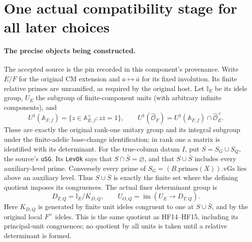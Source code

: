 \section{One actual compatibility stage for all later choices}
\label{sec:common-compatibility-v48}


\paragraph{The precise objects being constructed.}
The accepted source is the pin recorded in this component's provenance.
Write \(E/F\) for the original CM extension and \(a\mapsto\bar a\)
for its fixed involution.  Its finite relative primes are unramified,
as required by the original host.  Let \(\mathbb I_E\) be its idele
group, \(U_E\) the subgroup of finite-component units (with arbitrary
infinite components), and
\[
 U^1(\mathbb A_{F,f})=
 \{z\in\mathbb A_{E,f}^{\times}:z\bar z=1\},\qquad
 U^1(\widehat{\mathcal O}_F)=U^1(\mathbb A_{F,f})
                                  \cap\widehat{\mathcal O}_E^{\times}.
 \tag{GCF.1}
\]
These are exactly the original rank-one unitary group and its integral
subgroup under the finite-adelic base-change identification; in rank
one a matrix is identified with its determinant.  For the true-column
datum \(I\), put \(S=S_G\cup S_Q\), the source's \texttt{uSG}.
Its \texttt{LevOk} says that \(S\cap\bar S=\varnothing\), and that
\(S\cup\bar S\) includes every auxiliary-level prime.  Conversely every prime of
\(S_G=(B.\mathrm{primes}(X)).\mathrm{vGs}\) lies above an
auxiliary level.  Thus \(S\cup\bar S\) is exactly the finite
set where the defining quotient imposes its congruences.
The actual finer determinant group is
\[
 D_{T,Q}=\mathbb I_E/K_{D,Q},\qquad
 U_{O,Q}=\operatorname{im}(U_E\longrightarrow D_{T,Q}).
 \tag{GCF.2}
\]
Here \(K_{D,Q}\) is generated by finite unit ideles congruent to one
at \(S\cup\bar S\), and by the original local \(F^{\times}\)
ideles.  This is the same quotient as HF14--HF15, including its
principal-unit congruences; no quotient by all units is taken until a
relative determinant is formed.

